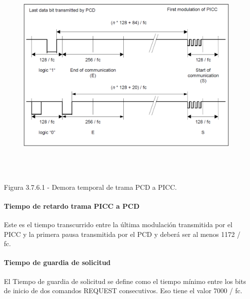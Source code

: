 \vspace{\baselineskip}



\begin{figure}[H]
	\begin{center}
		\includegraphics[width=6.1in,height=4.22in]{Norma_ISO/14443-3/media//image9.png}
        \end{center}
\end{figure}



\par
\begin{center}
Figura 3.7.6.1 - Demora temporal de trama PCD a PICC.
\end{center}
\par


\paragraph{Tiempo de retardo trama PICC a PCD}
Este es el tiempo transcurrido entre la última modulación transmitida por el PICC y la primera pausa transmitida por el PCD y deberá ser al menos 1172 / fc.\par

\paragraph{Tiempo de guardia de solicitud}
El Tiempo de guardia de solicitud se define como el tiempo mínimo entre los bits de inicio de dos comandos REQUEST consecutivos. Eso tiene el valor 7000 / fc.\par

